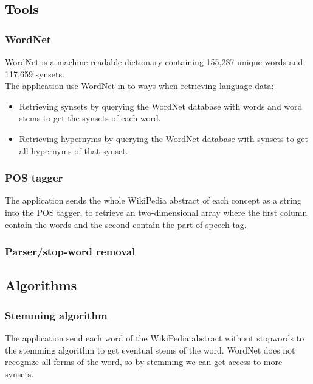 \subsection{Tools}

\subsubsection{WordNet}
WordNet is a machine-readable dictionary containing 155,287 unique words and 117,659 synsets. \parencite{fellbaum1998wordnet} \parencite{wordnetstatistics}
\\The application use WordNet in to ways when retrieving language data:
\begin{itemize}
	\item Retrieving synsets by querying the WordNet database with words and word stems to get the synsets of each word.
	\item Retrieving hypernyms by querying the WordNet database with synsets to get all hypernyms of that synset.
\end{itemize}

\subsubsection{POS tagger}
The application sends the whole WikiPedia abstract of each concept as a string into the POS tagger, to retrieve an two-dimensional array where the first column contain the words and the second contain the part-of-speech tag.

\subsubsection{Parser/stop-word removal}


\subsection{Algorithms}

\subsubsection{Stemming algorithm}
The application send each word of the WikiPedia abstract without stopwords to the stemming algorithm to get eventual stems of the word. WordNet does not recognize all forms of the word, so by stemming we can get access to more synsets.

